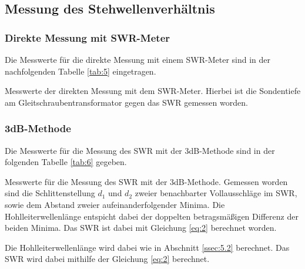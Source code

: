             
            \subsection{Messung des Stehwellenverhältnis}
                \subsubsection{Direkte Messung mit SWR-Meter}
                    Die Messwerte für die direkte Messung mit einem SWR-Meter sind in der nachfolgenden Tabelle \ref{tab:5}
                    eingetragen.
                    \begin{table}[H]
                        \centering
                        \caption{
                            Messwerte der direkten Messung mit dem SWR-Meter.
                            Hierbei ist die Sondentiefe am Gleitschraubentransformator gegen
                            das SWR gemessen worden.
                        } 
                        
                        \label{tab:5}
                    \end{table}

                \subsubsection{3dB-Methode}
                    Die Messwerte für die Messung des SWR mit der 3dB-Methode sind in der folgenden Tabelle \ref{tab:6} gegeben.
                    \begin{table}[H]
                        \centering
                        \caption{
                            Messwerte für die Messung des SWR mit der 3dB-Methode.
                            Gemessen worden sind die Schlittenstellung $d_1$ und $d_2$ zweier benachbarter Vollausschläge im SWR, sowie dem Abstand zweier aufeinanderfolgender
                            Minima. Die Hohlleiterwellenlänge entspicht dabei der doppelten betragsmäßigen Differenz der beiden Minima. Das SWR ist dabei mit Gleichung
                            \eqref{eq:2} berechnet worden.
                        }
                        
                        \label{tab:6} 
                    \end{table}
                    Die Hohlleiterwellenlänge wird dabei wie in Abschnitt \ref{ssec:5.2} berechnet.
                    Das SWR wird dabei mithilfe der Gleichung \eqref{eq:2} berechnet.


